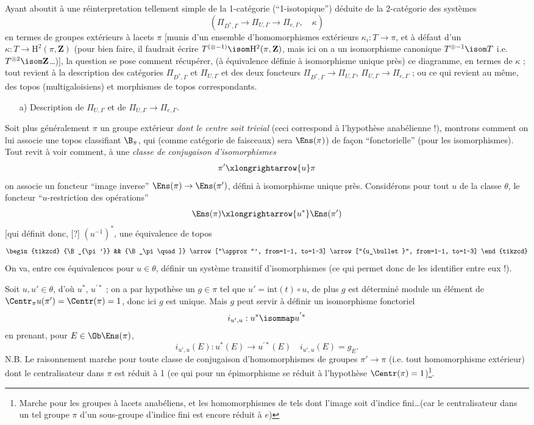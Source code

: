 Ayant aboutit à une réinterpretation tellement simple de la 1-catégorie (``1-isotopique'') déduite de la 2-catégorie des systèmes
$$
(\Pi_{D^*, \Gamma} \to \Pi_{U, \Gamma} \to \Pi_{e, \Gamma}, \quad \kappa)
$$
en termes de groupes extérieurs à lacets $\pi$ [munis d'un ensemble d'homomorphismes extérieurs $\kappa_i: T \to \pi$, et à défaut d'un $\kappa: T \to \mathrm{H}^2(\pi, \mathbf{Z})$ (pour bien faire, il faudrait écrire $T^{(\otimes - 1)} \isom \mathrm{H}^2(\pi, \mathbf{Z})$, mais ici on a un isomorphisme canonique $T^{\otimes - 1} \isom T$ i.e. $T^{\otimes 2} \isom \mathbf{Z}$\dots)], la question se pose comment récupérer, (à équivalence définie à isomorphisme unique près) ce diagramme, en termes de $\kappa$ ; tout revient à la description des catégories $\Pi_{D^*, \Gamma}$ et $\Pi_{U, \Gamma}$ et des deux foncteurs $\Pi_{D^*, \Gamma} \to \Pi_{U, \Gamma}$, $\Pi_{U, \Gamma} \to \Pi_{e, \Gamma}$ ; ou ce qui revient au même, des topos (multigaloisiens) et morphismes de topos correspondants.
\begin{enumerate}
    \item[a)] Description de $\Pi_{U, \Gamma}$ et de $\Pi_{U, \Gamma} \to \Pi_{e, \Gamma}$.
\end{enumerate}
Soit plus généralement $\pi$ un groupe extérieur \emph{dont le centre soit trivial} (ceci correspond à l'hypothèse anabélienne !), montrons comment on lui associe une topos classifiant $\B_\pi$, qui (comme catégorie de faisceaux) sera $\Ens (\pi)$) de fa\c{c}on ``fonctorielle'' (pour les isomorphismes). Tout revit à voir comment, à une \emph{classe de conjugaison d'isomorphismes}
$$
\pi' \xlongrightarrow{u} \pi
$$
on associe un foncteur ``image inverse'' $\Ens(\pi) \to \Ens (\pi')$, défini à isomorphisme unique près. Considérons pour tout $u$ de la classe $\theta$, le foncteur ``$u$-restriction des opérations''
$$
\Ens (\pi) \xlongrightarrow{u^*} \Ens (\pi')
$$
[qui définit donc, [?] $(u^{-1})^*$, une équivalence de topos
\[\begin{tikzcd}
	{\B_{\pi'}} && {\B_\pi \quad ]}
	\arrow["\approx"', from=1-1, to=1-3]
	\arrow["{u_\bullet}", from=1-1, to=1-3]
\end{tikzcd}\]
On va, entre ces équivalences pour $u \in \theta$, définir un système transitif d'isomorphismes (ce qui permet donc de les identifier entre eux !).

Soit $u, u' \in \theta$, d'où $u^*$, $u^{'*}$ ; on a par hypothèse un $g \in \pi$ tel que $u' = \text{int}(t) \circ u$, de plus $g$ est déterminé module un élément de $\Centr_\pi u(\pi') = \Centr (\pi) = 1$, donc ici $g$ est unique. Mais $g$ peut servir à définir un isomorphisme fonctoriel
$$
i_{u', u}: u^* \isommap u^{'*}
$$
en prenant, pour $E \in \Ob \Ens (\pi)$,
$$
i_{u', u}(E): u^*(E) \to u^{'*}(E) \quad i_{u', u}(E) = g_E.
$$
N.B. Le raisonnement marche pour toute classe de conjugaison d'homomorphismes de groupes $\pi' \to \pi$ (i.e. tout homomorphisme extérieur) dont le centralisateur dans $\pi$ est réduit à 1 (ce qui pour un épimorphisme se réduit à l'hypothèse $\Centr (\pi) = 1$)\footnote{Marche pour les groupes à lacets anabéliens, et les homomorphismes de tels dont l'image soit d'indice fini\dots (car le centralisateur dans un tel groupe $\pi$ d'un sous-groupe d'indice fini est encore réduit à $e$)}.

